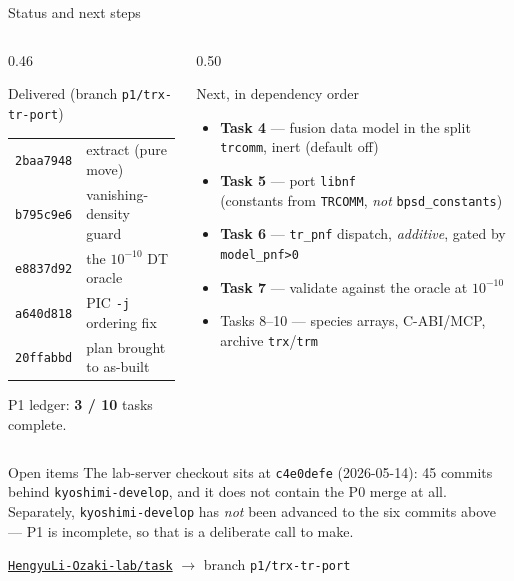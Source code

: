 \documentclass[10pt,aspectratio=169]{beamer}
\newcommand{\C}[1]{\texttt{\small #1}}          %
\begin{document}
\begin{frame}{Status and next steps}

\begin{columns}[T]
\begin{column}{0.46\textwidth}
\begin{exampleblock}{Delivered (branch \C{p1/trx-tr-port})}
\small
\begin{tabular}{@{}ll@{}}
\C{2baa7948} & extract (pure move) \\
\C{b795c9e6} & vanishing-density guard \\
\C{e8837d92} & the $10^{-10}$ DT oracle \\
\C{a640d818} & PIC \C{-j} ordering fix \\
\C{20ffabbd} & plan brought to as-built \\
\end{tabular}

\medskip
\small P1 ledger: \textbf{3 / 10} tasks complete.
\end{exampleblock}
\end{column}
\begin{column}{0.50\textwidth}
\begin{block}{Next, in dependency order}
\small
\begin{itemize}\itemsep2pt
  \item \textbf{Task 4} --- fusion data model in the split \C{trcomm}, inert (default off)
  \item \textbf{Task 5} --- port \C{libnf} \\ \scriptsize(constants from \C{TRCOMM}, \emph{not} \C{bpsd\_constants})
  \item \textbf{Task 6} --- \C{tr\_pnf} dispatch, \emph{additive}, gated by \C{model\_pnf>0}
  \item \textbf{Task 7} --- validate against the oracle at $10^{-10}$
  \item Tasks 8--10 --- species arrays, C-ABI/MCP, archive \C{trx}/\C{trm}
\end{itemize}
\end{block}
\end{column}
\end{columns}

\vspace{0.3em}
\begin{alertblock}{Open items}
The lab-server checkout sits at \C{c4e0defe} (2026-05-14): 45 commits behind \C{kyoshimi-develop}, and it does
not contain the P0 merge at all. Separately, \C{kyoshimi-develop} has \emph{not} been advanced to the six commits
above --- P1 is incomplete, so that is a deliberate call to make.
\end{alertblock}

\vspace{0.4em}
\centerline{\href{https://github.com/HengyuLi-Ozaki-lab/task/tree/p1/trx-tr-port}{\C{HengyuLi-Ozaki-lab/task}} $\to$ branch \C{p1/trx-tr-port}}
\end{frame}
\end{document}
